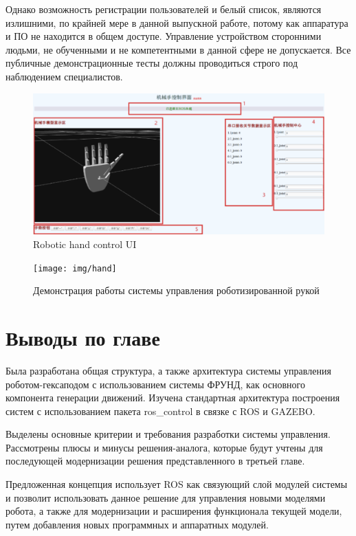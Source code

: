 Однако возможность регистрации пользователей и белый список, являются излишними, по крайней мере в данной выпускной работе, потому как аппаратура и ПО не находится в общем доступе. Управление устройством сторонними людьми, не обученными и не компетентными в данной сфере не допускается. Все публичные демонстрационные тесты должны проводиться строго под наблюдением специалистов.

\begin{figure}[h!]
	\centering
	\includegraphics[width = \linewidth]{img/webhand}
	\caption{Robotic hand control UI}
	\label{img:webhand}
\end{figure}

\begin{figure}[h!]
	\centering
	\texttt{[image: img/hand]}
	\caption{Демонстрация работы системы управления роботизированной рукой}
	\label{img:hand}
\end{figure}

\section{Выводы по главе}

Была разработана общая структура, а также архитектура системы управления роботом-гексаподом с использованием системы ФРУНД, как основного компонента генерации движений. Изучена стандартная архитектура построения систем с использованием пакета ros\_control в связке с ROS и GAZEBO.

Выделены основные критерии и требования разработки системы управления. Рассмотрены плюсы и минусы решения-аналога, которые будут учтены для последующей модернизации решения представленного в третьей главе.

Предложенная концепция использует ROS как связующий слой модулей системы и позволит использовать данное решение для управления новыми моделями робота, а также для модернизации и расширения функционала текущей модели, путем добавления новых программных и аппаратных модулей.